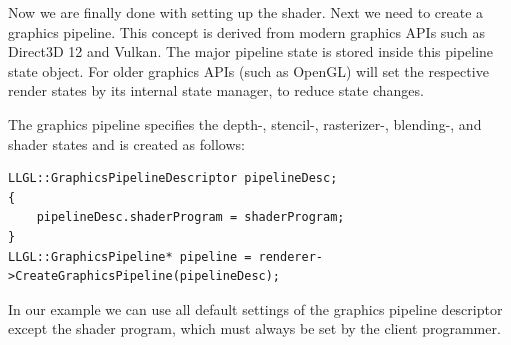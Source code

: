 \documentclass{article}
\begin{document}
Now we are finally done with setting up the shader. Next we need to create a graphics pipeline.
This concept is derived from modern graphics APIs such as Direct3D 12 and Vulkan.
The major pipeline state is stored inside this pipeline state object.
For older graphics APIs (such as OpenGL) \LLGL will set the respective render states by its internal state manager,
to reduce state changes.

The graphics pipeline specifies the depth-, stencil-, rasterizer-, blending-,
and shader states and is created as follows:
\begin{lstlisting}
LLGL::GraphicsPipelineDescriptor pipelineDesc;
{
    pipelineDesc.shaderProgram = shaderProgram;
}
LLGL::GraphicsPipeline* pipeline = renderer->CreateGraphicsPipeline(pipelineDesc);
\end{lstlisting}
In our example we can use all default settings of the graphics pipeline descriptor except the shader program,
which must always be set by the client programmer.
\end{document}
